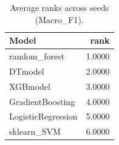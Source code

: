 \begin{table}[t]
\centering
\begin{tabular}{lr}
\toprule
Model & rank \\
\midrule
random_forest & 1.0000 \\
DTmodel & 2.0000 \\
XGBmodel & 3.0000 \\
GradientBoosting & 4.0000 \\
LogisticRegression & 5.0000 \\
sklearn_SVM & 6.0000 \\
\bottomrule
\end{tabular}
\caption{Average ranks across seeds (Macro_F1).}
\label{tab:avg_rank_Macro_F1}
\end{table}